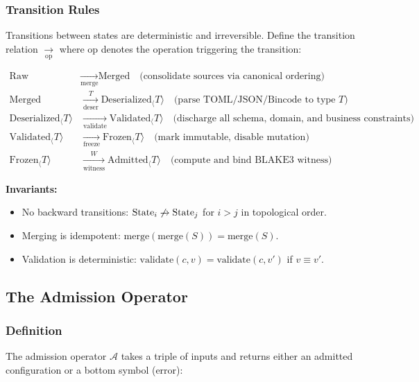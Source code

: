 \documentclass[11pt]{article}
\begin{document}
\subsubsection{Transition Rules}

Transitions between states are deterministic and irreversible. Define the transition relation $\xrightarrow[\text{op}]{}$ where $\text{op}$ denotes the operation triggering the transition:

\begin{align}
\text{Raw} &\xrightarrow[\text{merge}]{} \text{Merged} \quad \text{(consolidate sources via canonical ordering)} \\
\text{Merged} &\xrightarrow[\text{deser}]{T} \text{Deserialized}_\langle T \rangle \quad \text{(parse TOML/JSON/Bincode to type } T \text{)} \\
\text{Deserialized}_\langle T \rangle &\xrightarrow[\text{validate}]{} \text{Validated}_\langle T \rangle \quad \text{(discharge all schema, domain, and business constraints)} \\
\text{Validated}_\langle T \rangle &\xrightarrow[\text{freeze}]{} \text{Frozen}_\langle T \rangle \quad \text{(mark immutable, disable mutation)} \\
\text{Frozen}_\langle T \rangle &\xrightarrow[\text{witness}]{W} \text{Admitted}_\langle T \rangle \quad \text{(compute and bind BLAKE3 witness)}
\end{align}

\noindent \textbf{Invariants:}
\begin{itemize}
  \item No backward transitions: $\text{State}_i \not\xrightarrow{} \text{State}_j$ for $i > j$ in topological order.
  \item Merging is idempotent: $\text{merge}(\text{merge}(S)) = \text{merge}(S)$.
  \item Validation is deterministic: $\text{validate}(c, v) = \text{validate}(c, v')$ if $v \equiv v'$.
\end{itemize}

\subsection{The Admission Operator}

\subsubsection{Definition}

The admission operator $\mathcal{A}$ takes a triple of inputs and returns either an admitted configuration or a bottom symbol (error):
\end{document}
